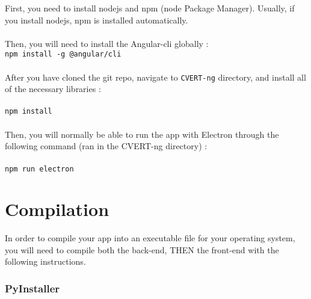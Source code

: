 \documentclass[12pt,a4paper]{article}
\begin{document}
First, you need to install nodejs and npm (node Package Manager). Usually, if you install nodejs, npm is installed automatically.\\
~\\
Then, you will need to install the Angular-cli globally :\\
\texttt{npm install -g @angular/cli}\\
~\\
After you have cloned the git repo, navigate to \texttt{CVERT-ng} directory, and install all of the necessary libraries :\\
~\\
\texttt{npm install}\\
~\\
Then, you will normally be able to run the app with Electron through the following command (ran in the CVERT-ng directory) :\\
~\\
\texttt{npm run electron}

\pagebreak

\part{Compilation}
\setcounter{section}{0}

In order to compile your app into an executable file for your operating system, you will need to compile both the back-end, THEN the front-end with the following instructions.

\section{PyInstaller}
\end{document}
